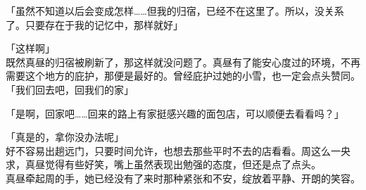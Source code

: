 「虽然不知道以后会变成怎样……但我的归宿，已经不在这里了。所以，没关系了。只要存在于我的记忆中，那样就好」

「这样啊」\\

既然真昼的归宿被刷新了，那这样就没问题了。真昼有了能安心度过的环境，不再需要这个地方的庇护，那便是最好的。曾经庇护过她的小雪，也一定会点头赞同。\\

「我们回去吧，回我们的家」

「是啊，回家吧……回来的路上有家挺感兴趣的面包店，可以顺便去看看吗？」

「真是的，拿你没办法呢」\\

好不容易出趟远门，只要时间允许，也想去那些平时不去的店看看。周这么一央求，真昼觉得有些好笑，嘴上虽然表现出勉强的态度，但还是点了点头。\\

真昼牵起周的手，她已经没有了来时那种紧张和不安，绽放着平静、开朗的笑容。

